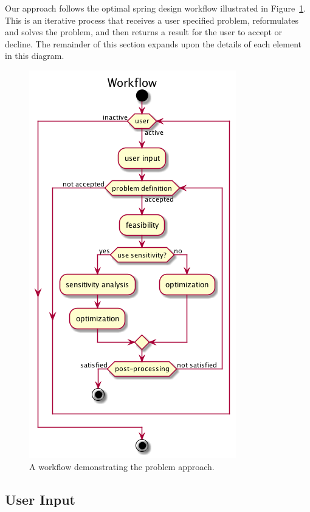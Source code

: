 \documentclass[10pt]{article}
\begin{document}
Our approach follows the optimal spring design workflow illustrated in Figure~\ref{fig:Workflow}. This is an iterative process that receives a user specified problem, reformulates and solves the problem, and then returns a result for the user to accept or decline. The remainder of this section expands upon the details of each element in this diagram.
		\begin{figure}[H]
		 \begin{center}\includegraphics[scale=.4]{IMSM_Workflow.png}\end{center}
		 \caption{A workflow demonstrating the problem approach.}
		 \label{fig:Workflow}
		 \end{figure}

\subsection{User Input}
\label{subsec:User_Input}
\end{document}

